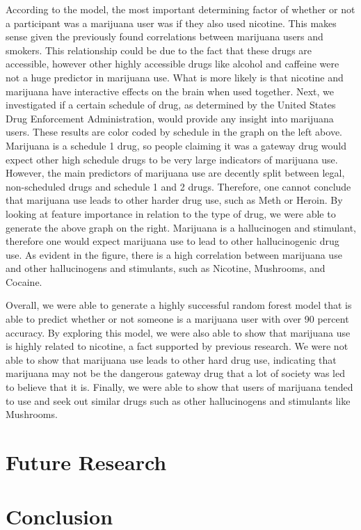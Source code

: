 \documentclass{article}
\begin{document}
According to the model, the most important determining factor of whether or not a participant was a marijuana user was if they also used nicotine. This makes sense given the previously found correlations between marijuana users and smokers. This relationship could be due to the fact that these drugs are accessible, however other highly accessible drugs like alcohol and caffeine were not a huge predictor in marijuana use. What is more likely is that nicotine and marijuana have interactive effects on the brain when used together. 
Next, we investigated if a certain schedule of drug, as determined by the United States Drug Enforcement Administration, would provide any insight into marijuana users. These results are color coded by schedule in the graph on the left above. Marijuana is a schedule 1 drug, so people claiming it was a gateway drug would expect other high schedule drugs to be very large indicators of marijuana use. However, the main predictors of marijuana use are decently split between legal, non-scheduled drugs and schedule 1 and 2 drugs. Therefore, one cannot conclude that marijuana use leads to other harder drug use, such as Meth or Heroin.
By looking at feature importance in relation to the type of drug, we were able to generate the above graph on the right. Marijuana is a hallucinogen and stimulant, therefore one would expect marijuana use to lead to other hallucinogenic drug use. As evident in the figure, there is a high correlation between marijuana use and other hallucinogens and stimulants, such as Nicotine, Mushrooms, and Cocaine.
	
Overall, we were able to generate a highly successful random forest model that is able to predict whether or not someone is a marijuana user with over 90 percent accuracy. By exploring this model, we were also able to show that marijuana use is highly related to nicotine, a fact supported by previous research. We were not able to show that marijuana use leads to other hard drug use, indicating that marijuana may not be the dangerous gateway drug that a lot of society was led to believe that it is. Finally, we were able to show that users of marijuana tended to use and seek out similar drugs such as other hallucinogens and stimulants like Mushrooms. 


\section{Future Research}

\section{Conclusion}
\end{document}
